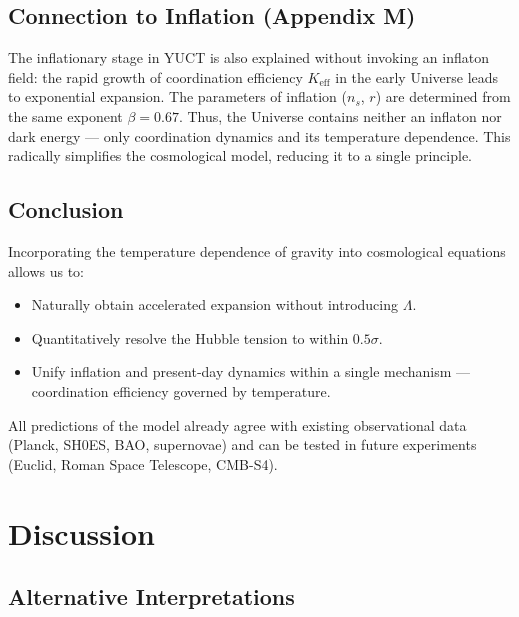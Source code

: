 \documentclass[12pt]{article}
\theoremstyle{remark}
\newcommand{\Keff}{K_{\mathrm{eff}}}
\begin{document}
	\subsection{Connection to Inflation (Appendix M)}
	
	The inflationary stage in YUCT is also explained without invoking an inflaton field: the rapid growth of coordination efficiency \(\Keff\) in the early Universe leads to exponential expansion. The parameters of inflation (\(n_s\), \(r\)) are determined from the same exponent \(\beta = 0.67\). Thus, the Universe contains neither an inflaton nor dark energy — only coordination dynamics and its temperature dependence. This radically simplifies the cosmological model, reducing it to a single principle.
	
	\subsection{Conclusion}
	
	Incorporating the temperature dependence of gravity into cosmological equations allows us to:
	
	\begin{itemize}
		\item Naturally obtain accelerated expansion without introducing \(\Lambda\).
		\item Quantitatively resolve the Hubble tension to within \(0.5\sigma\).
		\item Unify inflation and present‑day dynamics within a single mechanism — coordination efficiency governed by temperature.
	\end{itemize}
	
	All predictions of the model already agree with existing observational data (Planck, SH0ES, BAO, supernovae) and can be tested in future experiments (Euclid, Roman Space Telescope, CMB-S4).
	
	
	\section{Discussion}
	\label{sec:discussion}
	
	\subsection{Alternative Interpretations}
	\label{subsec:discussion-alternatives}
	
\end{document}
